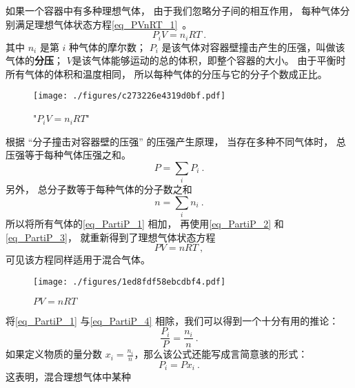 

如果一个容器中有多种理想气体， 由于我们忽略分子间的相互作用， 每种气体分别满足理想气体状态方程\autoref{eq_PVnRT_1}~。
\begin{equation}\label{eq_PartiP_1}
P_i V = n_i R T~.
\end{equation}
其中 $n_i$ 是第 $i$ 种气体的摩尔数； $P_i$ 是该气体对容器壁撞击产生的压强，叫做该气体的\textbf{分压}； $V$是该气体能够运动的总的体积，即整个容器的大小。 由于平衡时所有气体的体积和温度相同， 所以每种气体的分压与它的分子个数成正比。
\begin{figure}[ht]
\centering
\texttt{[image: ./figures/c273226e4319d0bf.pdf]}
\caption{"$P_i V = n_i R T$"} \label{fig_PartiP_4}
\end{figure}

根据 “分子撞击对容器壁的压强” 的压强产生原理， 当存在多种不同气体时， 总压强等于每种气体压强之和。
\begin{equation}\label{eq_PartiP_2}
P = \sum_i P_i~.
\end{equation}
另外， 总分子数等于每种气体的分子数之和
\begin{equation}\label{eq_PartiP_3}
n = \sum_i n_i~.
\end{equation}
所以将所有气体的\autoref{eq_PartiP_1} 相加， 再使用\autoref{eq_PartiP_2} 和\autoref{eq_PartiP_3}， 就重新得到了理想气体状态方程
\begin{equation}\label{eq_PartiP_4}
P V = n RT~,
\end{equation}
可见该方程同样适用于混合气体。

\begin{figure}[ht]
\centering
\texttt{[image: ./figures/1ed8fdf58ebcdbf4.pdf]}
\caption{$P V = n RT$} \label{fig_PartiP_3}
\end{figure}

将\autoref{eq_PartiP_1} 与\autoref{eq_PartiP_4}  相除，我们可以得到一个十分有用的推论：
\begin{equation}
\frac{P_i}{P} = \frac{n_i}{n} ~.
\end{equation}
如果定义物质的量分数 $x_i = \frac{n_i}{n}$，那么该公式还能写成言简意骇的形式：
\begin{equation}
P_i = P x_i ~.
\end{equation}
这表明，混合理想气体中某种
